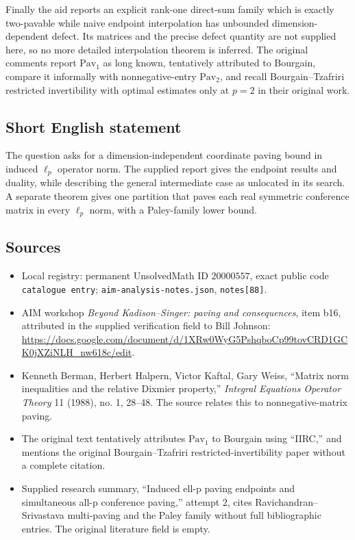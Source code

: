 \documentclass[11pt]{article}
\begin{document}
Finally the aid reports an explicit rank-one direct-sum family which is exactly two-pavable while naive endpoint interpolation has unbounded dimension-dependent defect. Its matrices and the precise defect quantity are not supplied here, so no more detailed interpolation theorem is inferred. The original comments report \(\mathrm{Pav}_1\) as long known, tentatively attributed to Bourgain, compare it informally with nonnegative-entry \(\mathrm{Pav}_2\), and recall Bourgain--Tzafriri restricted invertibility with optimal estimates only at \(p=2\) in their original work.
\subsection{Short English statement}
The question asks for a dimension-independent coordinate paving bound in induced \(\ell_p\) operator norm. The supplied report gives the endpoint results and duality, while describing the general intermediate case as unlocated in its search. A separate theorem gives one partition that paves each real symmetric conference matrix in every \(\ell_p\) norm, with a Paley-family lower bound.
\subsection{Sources}
\begin{itemize}
\item Local registry: permanent UnsolvedMath ID \(20000557\), exact public code \texttt{catalogue entry}; \texttt{aim-analysis-notes.json}, \texttt{notes[88]}.
\item AIM workshop \emph{Beyond Kadison--Singer: paving and consequences}, item b16, attributed in the supplied verification field to Bill Johnson: \url{https://docs.google.com/document/d/1XRw0WyG5PshqboCp99tovCRD1GCK0jXZiNLH_nw618c/edit}.
\item Kenneth Berman, Herbert Halpern, Victor Kaftal, Gary Weiss, ``Matrix norm inequalities and the relative Dixmier property,'' \emph{Integral Equations Operator Theory} 11 (1988), no. 1, 28--48. The source relates this to nonnegative-matrix paving.
\item The original text tentatively attributes \(\mathrm{Pav}_1\) to Bourgain using ``IIRC,'' and mentions the original Bourgain--Tzafriri restricted-invertibility paper without a complete citation.
\item Supplied research summary, ``Induced ell-p paving endpoints and simultaneous all-p conference paving,'' attempt 2, cites Ravichandran--Srivastava multi-paving and the Paley family without full bibliographic entries. The original literature field is empty.
\end{itemize}
\end{document}
